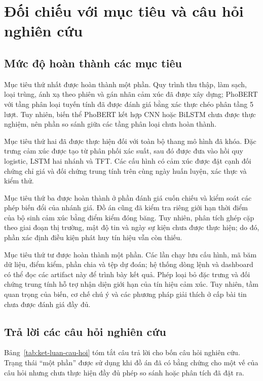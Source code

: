 \documentclass[12pt, a4paper, oneside]{report}
\begin{document}
\section{Đối chiếu với mục tiêu và câu hỏi nghiên cứu}

\subsection{Mức độ hoàn thành các mục tiêu}

Mục tiêu thứ nhất được hoàn thành một phần. Quy trình thu thập, làm sạch, loại trùng,
ánh xạ theo phiên và gán nhãn cảm xúc đã được xây dựng; PhoBERT với tầng phân loại
tuyến tính đã được đánh giá bằng xác thực chéo phân tầng 5 lượt. Tuy nhiên, biến thể
PhoBERT kết hợp CNN hoặc BiLSTM chưa được thực nghiệm, nên phần so sánh giữa các tầng
phân loại chưa hoàn thành.

Mục tiêu thứ hai đã được thực hiện đối với toàn bộ thang mô hình đã khóa. Đặc trưng cảm
xúc được tạo từ phân phối xác suất, sau đó được đưa vào hồi quy logistic, LSTM hai
nhánh và TFT. Các cấu hình có cảm xúc được đặt cạnh đối chứng chỉ giá và đối chứng
trung tính trên cùng ngày huấn luyện, xác thực và kiểm thử.

Mục tiêu thứ ba được hoàn thành ở phần đánh giá cuốn chiếu và kiểm soát các phép biến
đổi của nhánh giá. Đồ án cũng đã kiểm tra riêng giới hạn thời điểm của bộ sinh cảm xúc
bằng điểm kiểm đóng băng. Tuy nhiên, phân tích ghép cặp theo giai đoạn thị trường, mật
độ tin và ngày sự kiện chưa được thực hiện; do đó, phần xác định điều kiện phát huy tín
hiệu vẫn còn thiếu.

Mục tiêu thứ tư được hoàn thành một phần. Các lần chạy lưu cấu hình, mã băm dữ liệu,
điểm kiểm, phần chia và tệp dự đoán; hệ thống dòng lệnh và dashboard có thể đọc các
artifact này để trình bày kết quả. Phép loại bỏ đặc trưng và đối chứng trung tính hỗ
trợ nhận diện giới hạn của tín hiệu cảm xúc. Tuy nhiên, tầm quan trọng của biến, cơ chế
chú ý và các phương pháp giải thích ở cấp bài tin chưa được đánh giá đầy đủ.

\subsection{Trả lời các câu hỏi nghiên cứu}

Bảng~\ref{tab:ket-luan-cau-hoi} tóm tắt câu trả lời cho bốn câu hỏi nghiên cứu. Trạng
thái ``một phần'' được sử dụng khi đồ án đã có bằng chứng cho một vế của câu hỏi nhưng
chưa thực hiện đầy đủ phép so sánh hoặc phân tích đã đặt ra.
\end{document}
